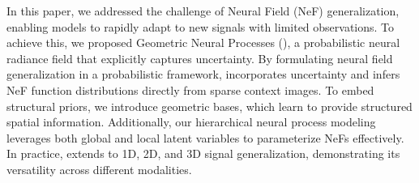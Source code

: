 


\label{sec:conclusion}
In this paper, we addressed the challenge of Neural Field (NeF) generalization, enabling models to rapidly adapt to new signals with limited observations. To achieve this, we proposed Geometric Neural Processes (\name{}), a probabilistic neural radiance field that explicitly captures uncertainty.  
By formulating neural field generalization in a probabilistic framework, \name{} incorporates uncertainty and infers NeF function distributions directly from sparse context images. To embed structural priors, we introduce geometric bases, which learn to provide structured spatial information. Additionally, our hierarchical neural process modeling leverages both global and local latent variables to parameterize NeFs effectively.  
In practice, \name{} extends to 1D, 2D, and 3D signal generalization, demonstrating its versatility across different modalities.


